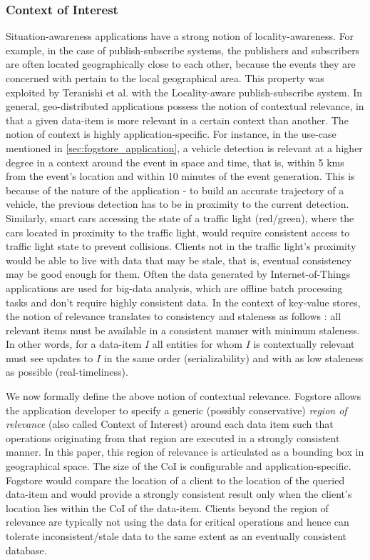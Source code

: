 \subsubsection{Context of Interest}
Situation-awareness applications have a strong notion of locality-awareness. For example, in the case of publish-subscribe systems, the publishers and subscribers are often located geographically close to each other, because the events they are concerned with pertain to the local geographical area. This property was exploited by Teranishi et al. \cite{teranishi2015scalable} with the Locality-aware publish-subscribe system. In general, geo-distributed applications possess the notion of contextual relevance, in that a given data-item is more relevant in a certain context than another. The notion of context is highly application-specific. For instance, in the use-case mentioned in \cref{sec:fogstore_application}, a vehicle detection is relevant at a higher degree in a context around the event in space and time, that is, within 5 kms from the event’s location and within 10 minutes of the event generation. This is because of the nature of the application - to build an accurate trajectory of a vehicle, the previous detection has to be in proximity to the current detection. Similarly, smart cars accessing the state of a traffic light (red/green), where the cars located in proximity to the traffic light, would require consistent access to traffic light state to prevent collisions. Clients not in the traffic light's proximity would be able to live with data that may be stale, that is, eventual consistency may be good enough for them. Often the data generated by Internet-of-Things applications are used for big-data analysis, which are offline batch processing tasks and don’t require highly consistent data. In the context of key-value stores, the notion of relevance translates to consistency and staleness as follows : all relevant items must be available in a consistent manner with minimum staleness. In other words, for a data-item $I$ all entities for whom $I$ is contextually relevant must see updates to $I$ in the same order (serializability) and with as low staleness as possible (real-timeliness).

\par We now formally define the above notion of contextual relevance. Fogstore allows the application developer to specify a generic (possibly conservative) \emph{region of relevance} (also called Context of Interest) around each data item such that operations originating from that region are executed in a strongly consistent manner. In this paper, this region of relevance is articulated as a bounding box in geographical space. The size of the CoI is configurable and application-specific. Fogstore would compare the location of a client to the location of the queried data-item and would provide a strongly consistent result only when the client's location lies within the CoI of the data-item. Clients beyond the region of relevance are typically not using the data for critical operations and hence can tolerate inconsistent/stale data to the same extent as an eventually consistent database.

